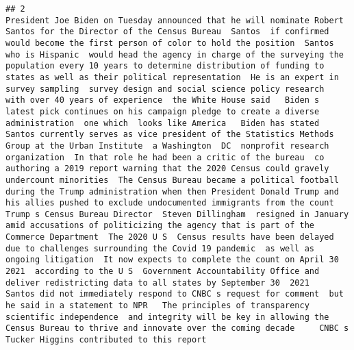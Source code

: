 \documentclass[
]{article}
\begin{document}
\begin{verbatim}
## 2                                                                                                                                                                                                                                                                                                                                                                                                                                                                                                                                                                                                                                                                                       President Joe Biden on Tuesday announced that he will nominate Robert Santos for the Director of the Census Bureau  Santos  if confirmed  would become the first person of color to hold the position  Santos  who is Hispanic  would head the agency in charge of the surveying the population every 10 years to determine distribution of funding to states as well as their political representation  He is an expert in survey sampling  survey design and social science policy research  with over 40 years of experience  the White House said   Biden s latest pick continues on his campaign pledge to create a diverse administration  one which  looks like America   Biden has stated  Santos currently serves as vice president of the Statistics Methods Group at the Urban Institute  a Washington  DC  nonprofit research organization  In that role he had been a critic of the bureau  co authoring a 2019 report warning that the 2020 Census could gravely undercount minorities  The Census Bureau became a political football during the Trump administration when then President Donald Trump and his allies pushed to exclude undocumented immigrants from the count  Trump s Census Bureau Director  Steven Dillingham  resigned in January amid accusations of politicizing the agency that is part of the Commerce Department  The 2020 U S  Census results have been delayed due to challenges surrounding the Covid 19 pandemic  as well as ongoing litigation  It now expects to complete the count on April 30  2021  according to the U S  Government Accountability Office and  deliver redistricting data to all states by September 30  2021   Santos did not immediately respond to CNBC s request for comment  but he said in a statement to NPR   The principles of transparency  scientific independence  and integrity will be key in allowing the Census Bureau to thrive and innovate over the coming decade     CNBC s Tucker Higgins contributed to this report 

\end{verbatim}
\end{document}
